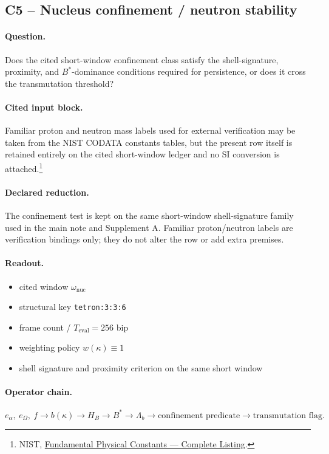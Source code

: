 \subsection{C5 -- Nucleus confinement / neutron stability}\label{suppc:c5-nucleus-confinement}
\paragraph{Question.} Does the cited short-window confinement class satisfy the shell-signature, proximity, and $B^*$-dominance conditions required for persistence, or does it cross the transmutation threshold?

\paragraph{Cited input block.} Familiar proton and neutron mass labels used for external verification may be taken from the NIST CODATA constants tables, but the present row itself is retained entirely on the cited short-window ledger and no SI conversion is attached.\footnote{NIST, \href{https://physics.nist.gov/cuu/Constants/Table/allascii.txt}{Fundamental Physical Constants --- Complete Listing}.}

\paragraph{Declared reduction.} The confinement test is kept on the same short-window shell-signature family used in the main note and Supplement A. Familiar proton/neutron labels are verification bindings only; they do not alter the row or add extra premises.

\paragraph{Readout.}
\begin{itemize}
\item cited window $\omega_{\mathrm{nuc}}$
\item structural key \texttt{tetron:3:3:6}
\item frame count / $T_{\mathrm{eval}}=256$ bip
\item weighting policy $w(\kappa)\equiv 1$
\item shell signature and proximity criterion on the same short window
\end{itemize}

\paragraph{Operator chain.}
\[
e_\alpha,\ e_\Omega,\ f
\to
b(\kappa)
\to
H_B
\to
B^*
\to
\Lambda_b
\to
\text{confinement predicate}
\to
\text{transmutation flag}.
\]

